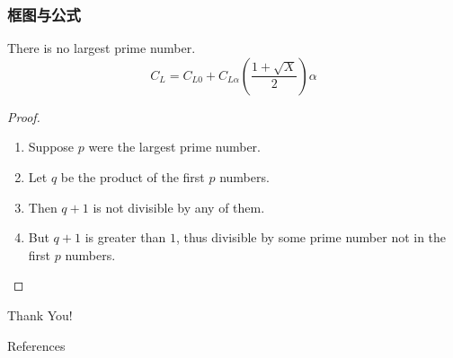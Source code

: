 \documentclass{beamer}
\begin{document}
\begin{frame}
  \frametitle{框图与公式}
  \begin{theorem}
    There is no largest prime number.
    \begin{equation}
      \label{eqn:LBmodel}
      C_{L}=C_{L0}+C_{L\alpha }\left ( \frac{1+\sqrt{X}}{2} \right )\alpha 
    \end{equation}
  \end{theorem}

  \begin{proof}
  \begin{enumerate}
    \item<1-| alert@1> Suppose $p$ were the largest prime number.
    \item<2-> Let $q$ be the product of the first $p$ numbers.
    \item<3-> Then $q+1$ is not divisible by any of them.
    \item<1-> But $q + 1$ is greater than $1$, thus divisible by some prime number not in the first $p$ numbers.\qedhere
    \end{enumerate}
  \end{proof}

\end{frame}

\begin{frame}
Thank You!

\end{frame}

\begin{frame}[allowframebreaks]{References} 
  \scriptsize
  
  
\end{frame}
\end{document}
